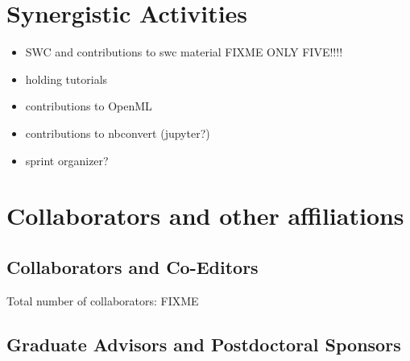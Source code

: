 \section*{Synergistic Activities}
\begin{itemize}
\item SWC and contributions to swc material FIXME ONLY FIVE!!!!
\item holding tutorials
\item contributions to OpenML
\item contributions to nbconvert (jupyter?)
\item sprint organizer?
\end{itemize}

\section{Collaborators and other affiliations}
\subsection*{Collaborators and Co-Editors}
Total number of collaborators: FIXME\\

\subsection*{Graduate Advisors and Postdoctoral Sponsors}



